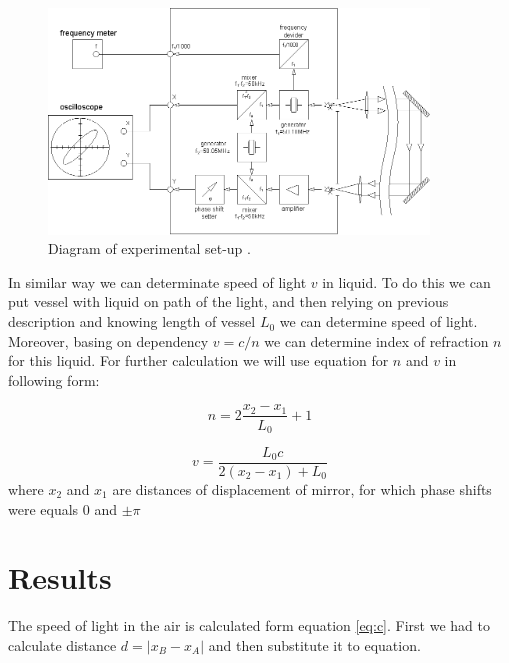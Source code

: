 \documentclass[a4paper,12pt]{article}
\begin{document}
    \begin{figure}[H]
    \begin{center}
        \includegraphics[width=0.9\textwidth]{set-up}
        \caption{Diagram of experimental set-up \cite{E418}.}
        \label{fig:set-up}
    \end{center}
    \end{figure}

    In similar way we can determinate speed of light $v$ in liquid. To do this we can put vessel with liquid on path of the light, and then relying on previous description and knowing length of vessel $L_0$ we can determine speed of light. Moreover, basing on dependency $v = c/n$ \cite{HRW} we can determine index of refraction $n$ for this liquid. For further calculation we will use equation for $n$ and $v$ in following form:

    \begin{equation}
        n = 2 \frac{x_2-x_1}{L_0} + 1 \label{eq:n}
    \end{equation}
    
    \begin{equation}
        v = \frac{L_0 c}{2(x_2 - x_1) + L_0} \label{eq:v}
    \end{equation}
    where $x_2$ and $x_1$ are distances of displacement of mirror, for which phase shifts were equals 0 and $\pm \pi$ 


    \section{Results}
    
    The speed of light in the air is calculated form equation \ref{eq:c}. First we had to calculate distance $ d = |x_B - x_A|$ and then substitute it to equation. 
\end{document}
